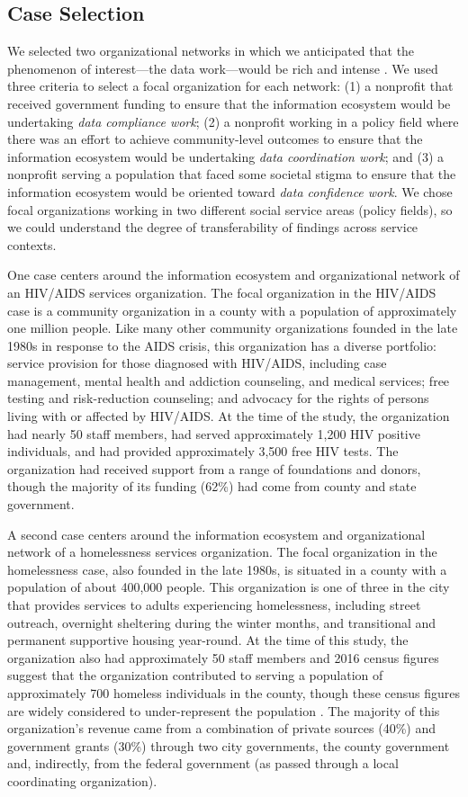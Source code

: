 \subsection{Case Selection}
We selected two organizational networks in which we anticipated that the phenomenon of interest---the data work---would be rich and intense \citep{Patton2002Qualitative}. We used three criteria to select a focal organization for each network: (1) a nonprofit that received government funding to ensure that the information ecosystem would be undertaking \textit{data compliance work}; (2) a nonprofit working in a policy field where there was an effort to achieve community-level outcomes to ensure that the information ecosystem would be undertaking \textit{data coordination work}; and (3) a nonprofit serving a population that faced some societal stigma to ensure that the information ecosystem would be oriented toward \textit{data confidence work}. We chose focal organizations working in two different social service areas (policy fields), so we could understand the degree of transferability of findings across service contexts. 

One case centers around the information ecosystem and organizational network of an HIV/AIDS services organization. The focal organization in the HIV/AIDS case is a community organization in a county with a population of approximately one million people. Like many other community organizations founded in the late 1980s in response to the AIDS crisis, this organization has a diverse portfolio: service provision for those diagnosed with HIV/AIDS, including case management, mental health and addiction counseling, and medical services; free testing and risk-reduction counseling; and advocacy for the rights of persons living with or affected by HIV/AIDS. At the time of the study, the organization had nearly 50 staff members, had served approximately 1,200 HIV positive individuals, and had provided approximately 3,500 free HIV tests. The organization had received support from a range of foundations and donors, though the majority of its funding (62\%) had come from county and state government. 

A second case centers around the information ecosystem and organizational network of a homelessness services organization. The focal organization in the homelessness case, also founded in the late 1980s, is situated in a county with a population of about 400,000 people. This organization is one of three in the city that provides services to adults experiencing homelessness, including street outreach, overnight sheltering during the winter months, and transitional and permanent supportive housing year-round. At the time of this study, the organization also had approximately 50 staff members and 2016 census figures suggest that the organization contributed to serving a population of approximately 700 homeless individuals in the county, though these census figures are widely considered to under-represent the population \citep{Schneider2016Know}. The majority of this organization's revenue came from a combination of private sources (40\%) and government grants (30\%) through two city governments, the county government and, indirectly, from the federal government (as passed through a local coordinating organization).  	


